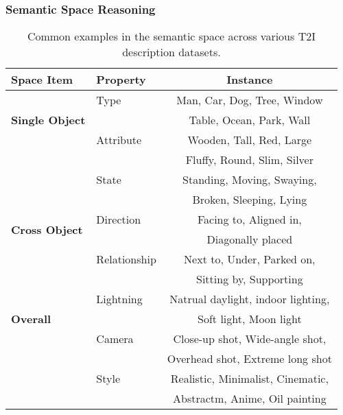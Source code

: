 \subsubsection{Semantic Space Reasoning}
\begin{table}[thb] \small
    \centering
    \caption{Common examples in the semantic space across various T2I description datasets.}
    \vspace{-2mm}
    \begin{tabular}{|l|l|c|}
    \hline 
    \textbf{Space Item} & \textbf{Property} & \textbf{Instance} \\
    \hline 
    \multirow{3}{*}{\textbf{Single Object}} 
    & Type &   Man, Car, Dog, Tree, Window \\
    && Table, Ocean, Park, Wall\\ \cline{2-3}
    & Attribute & Wooden, Tall, Red, Large\\
    &&Fluffy, Round, Slim, Silver   \\ \cline{2-3}
    & State &   Standing, Moving, Swaying, \\
    &&Broken, Sleeping, Lying\\\hline
    \multirow{2}{*}{\textbf{Cross Object}} 
    &  Direction  &  Facing to, Aligned in, \\
    &&Diagonally placed\\\cline{2-3}
    & Relationship & Next to, Under, Parked on, \\
    &&Sitting by, Supporting\\ \hline
    \multirow{3}{*}{\textbf{Overall}}  
    & Lightning  &   Natrual daylight, indoor lighting, \\
    && Soft light, Moon light\\\cline{2-3}
    & Camera  &   Close-up shot, Wide-angle shot, \\
    && Overhead shot, Extreme long shot \\\cline{2-3}
    & Style  &   Realistic, Minimalist, Cinematic, \\
    && Abstractm, Anime, Oil painting\\
    \hline
    \end{tabular}
    \vspace{-1mm}
    \label{tab:example_space}
\end{table}



